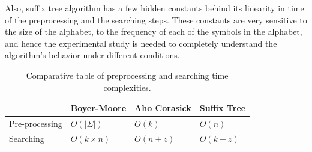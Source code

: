 \documentclass[paper=a4, fontsize=11pt]{scrartcl} %
\numberwithin{equation}{section} %
\numberwithin{figure}{section} %
\numberwithin{table}{section} %
\begin{document}
\par Also, suffix tree algorithm has a few hidden constants behind its linearity in time of the preprocessing and the searching steps. These constants are very sensitive to the size of the alphabet, to the frequency of each of the symbols in the alphabet, and hence the experimental study is needed to completely understand the algorithm's behavior under different conditions.

\begin{table}[h!]
\centering
\begin{tabular}{| l | l | l | l |}
	\hline
	& Boyer-Moore & Aho Corasick & Suffix Tree \\
	\hline
	Pre-processing & $O(|\Sigma|)$ & $O(k)$ & $O(n)$ \\
	\hline
	Searching & $O(k\times n)$ & $O(n + z)$ & $O(k + z)$ \\
	\hline
\end{tabular}
\caption{Comparative table of preprocessing and searching time complexities.}
\end{table}


\newpage

\end{document}
